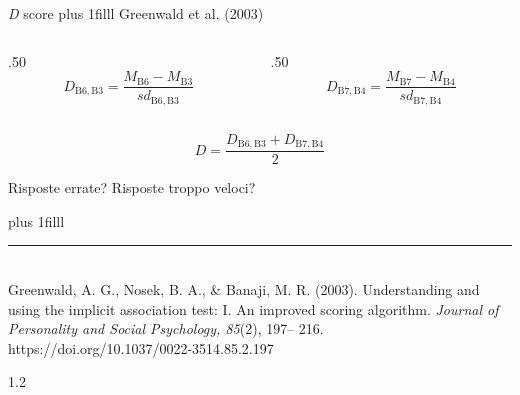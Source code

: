 \documentclass{beamer}
\newcommand\Factor{1.2}
\begin{document}
\begin{frame}{\emph{D} score}
	\vskip0pt plus 1filll
	Greenwald et al. (2003)
	
	\vspace{5mm}
	\begin{columns}
		\begin{column}{.50\linewidth}
			$$D_{\mathrm{B6,B3}} = \frac{M_{\mathrm{B6}} - M_{\mathrm{B3}}}{sd_{\mathrm{B6, B3}}}$$
		\end{column}
		\begin{column}{.50\linewidth}
			$$D_{\mathrm{B7,B4}} = \frac{M_{\mathrm{B7}} - M_{\mathrm{B4}}}{sd_{\mathrm{B7, B4}}}$$
		\end{column}
	\end{columns}
	
	\vspace{5mm}
	\begin{equation*}
		D = \frac{D_{\mathrm{B6,B3}} + D_{\mathrm{B7,B4}}}{2}
	\end{equation*}
	
	\pause
	\vspace{5mm}
	Risposte errate? Risposte troppo veloci?
	
	\vskip0pt plus 1filll
	
	\color{template}\rule{0.30\linewidth}{0.5pt}\\
	\color{black}
	\scriptsize{Greenwald, A. G., Nosek, B. A., \& Banaji, M. R.
		(2003). Understanding and using the implicit association test: I. An improved scoring algorithm. \emph{Journal
			of Personality and Social Psychology, 85}(2), 197–
		216. https://doi.org/10.1037/0022-3514.85.2.197}
\end{frame}

\begin{frame}
	
	\begin{spacing}\Factor
		\begin{table}[th!]
			\centering
			\caption{\label{tab:overview} Panoramica degli algoritmi di scoring}

		\end{table}
	\end{spacing}
\end{frame}
\end{document}
